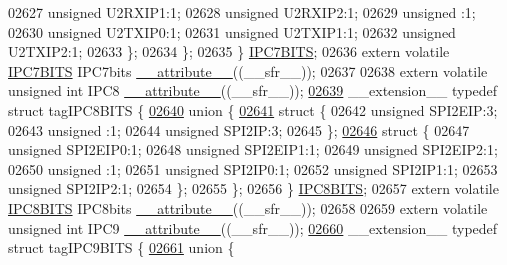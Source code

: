\begin{DoxyCode}
02627       \textcolor{keywordtype}{unsigned} U2RXIP1:1;
02628       \textcolor{keywordtype}{unsigned} U2RXIP2:1;
02629       \textcolor{keywordtype}{unsigned} :1;
02630       \textcolor{keywordtype}{unsigned} U2TXIP0:1;
02631       \textcolor{keywordtype}{unsigned} U2TXIP1:1;
02632       \textcolor{keywordtype}{unsigned} U2TXIP2:1;
02633     \};
02634   \};
02635 \} \hyperlink{a00008_dc/dea/a00558}{IPC7BITS};
02636 \textcolor{keyword}{extern} \textcolor{keyword}{volatile} \hyperlink{a00008_dc/dea/a00558}{IPC7BITS} IPC7bits \hyperlink{a00009_a493c46f03454991ccc5aa7a6e1dfb2a7}{\_\_attribute\_\_}((\_\_sfr\_\_));
02637 
02638 \textcolor{keyword}{extern} \textcolor{keyword}{volatile} \textcolor{keywordtype}{unsigned} \textcolor{keywordtype}{int}  IPC8 \hyperlink{a00009_a493c46f03454991ccc5aa7a6e1dfb2a7}{\_\_attribute\_\_}((\_\_sfr\_\_));
\hypertarget{a00009_source_l02639}{}\hyperlink{a00008}{02639} \_\_extension\_\_ \textcolor{keyword}{typedef} \textcolor{keyword}{struct }tagIPC8BITS \{
\hypertarget{a00009_source_l02640}{}\hyperlink{a00009}{02640}   \textcolor{keyword}{union }\{
\hypertarget{a00009_source_l02641}{}\hyperlink{a00009}{02641}     \textcolor{keyword}{struct }\{
02642       \textcolor{keywordtype}{unsigned} SPI2EIP:3;
02643       \textcolor{keywordtype}{unsigned} :1;
02644       \textcolor{keywordtype}{unsigned} SPI2IP:3;
02645     \};
\hypertarget{a00009_source_l02646}{}\hyperlink{a00009}{02646}     \textcolor{keyword}{struct }\{
02647       \textcolor{keywordtype}{unsigned} SPI2EIP0:1;
02648       \textcolor{keywordtype}{unsigned} SPI2EIP1:1;
02649       \textcolor{keywordtype}{unsigned} SPI2EIP2:1;
02650       \textcolor{keywordtype}{unsigned} :1;
02651       \textcolor{keywordtype}{unsigned} SPI2IP0:1;
02652       \textcolor{keywordtype}{unsigned} SPI2IP1:1;
02653       \textcolor{keywordtype}{unsigned} SPI2IP2:1;
02654     \};
02655   \};
02656 \} \hyperlink{a00008_d2/d50/a00561}{IPC8BITS};
02657 \textcolor{keyword}{extern} \textcolor{keyword}{volatile} \hyperlink{a00008_d2/d50/a00561}{IPC8BITS} IPC8bits \hyperlink{a00009_a493c46f03454991ccc5aa7a6e1dfb2a7}{\_\_attribute\_\_}((\_\_sfr\_\_));
02658 
02659 \textcolor{keyword}{extern} \textcolor{keyword}{volatile} \textcolor{keywordtype}{unsigned} \textcolor{keywordtype}{int}  IPC9 \hyperlink{a00009_a493c46f03454991ccc5aa7a6e1dfb2a7}{\_\_attribute\_\_}((\_\_sfr\_\_));
\hypertarget{a00009_source_l02660}{}\hyperlink{a00008}{02660} \_\_extension\_\_ \textcolor{keyword}{typedef} \textcolor{keyword}{struct }tagIPC9BITS \{
\hypertarget{a00009_source_l02661}{}\hyperlink{a00009}{02661}   \textcolor{keyword}{union }\{

\end{DoxyCode}
